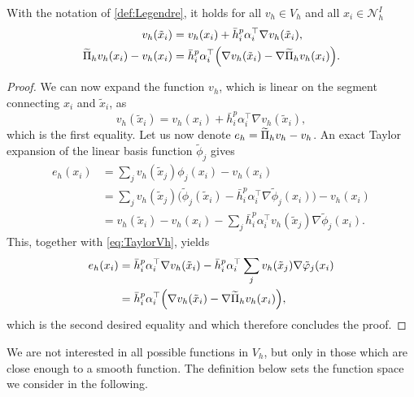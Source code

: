 \documentclass[10pt]{article}
\begin{document}
\begin{lemma}\label{lem:InterpPreliminary} With the notation of \cref{def:Legendre}, it holds for all $v_h \in V_h$ and all $x_i \in \mathcal N_h^I$
	\begin{equation}
	\begin{aligned}
		v_h(\tilde x_i) &= v_h(x_i) + \bar h_i^p \alpha_i^\top \nabla v_h(\tilde x_i), \\
		\widetilde \Pi_h v_h(x_i) - v_h(x_i) &= \bar h_i^p \alpha_i^\top \Big(\nabla v_h(\tilde x_i) - \nabla \widetilde \Pi_h v_h(x_i)\Big).
	\end{aligned}
	\end{equation}
\end{lemma}
\begin{proof} We can now expand the function $v_h$, which is linear on the segment connecting $x_i$ and $\tilde x_i$, as
	\begin{equation}\label{eq:TaylorVh}
	v_h(\tilde x_i) = v_h(x_i) + \bar h_i^p \alpha_i^\top \nabla v_h(\tilde x_i),
	\end{equation}
	which is the first equality. Let us now denote $e_h = \widetilde \Pi_h v_h - v_h$. An exact Taylor expansion of the linear basis function $\tilde \phi_j$ gives
	\begin{equation}
	\begin{aligned}
	e_h(x_i) &= \sum_{j} v_h(\tilde x_j) \phi_j(x_i) - v_h(x_i) \\
	&= \sum_j v_h(\tilde x_j) \Big(\tilde \phi_j(\tilde x_i) - \bar h_i^p \alpha_i^\top \nabla \tilde \phi_j(x_i)\Big) - v_h(x_i) \\
	&= v_h(\tilde x_i) - v_h(x_i) - \sum_j \bar h_i^p \alpha_i^\top v_h(\tilde x_j) \nabla \tilde \phi_j(x_i).
	\end{aligned}
	\end{equation}
	This, together with \eqref{eq:TaylorVh}, yields
	\begin{equation}
	\begin{aligned}
	e_h(x_i) &= \bar h_i^p \alpha_i^\top \nabla v_h(\tilde x_i) - \bar h_i^p \alpha_i^\top \sum_j v_h(\tilde x_j) \nabla \tilde {\varphi}_j(x_i) \\
	&= \bar h_i^p \alpha_i^\top \Big(\nabla v_h(\tilde x_i) - \nabla \widetilde \Pi_h v_h(x_i)\Big),
	\end{aligned}
	\end{equation}
	which is the second desired equality and which therefore concludes the proof.
\end{proof}


We are not interested in all possible functions in $V_h$, but only in those which are close enough to a smooth function. The definition below sets the function space we consider in the following.
\end{document}
